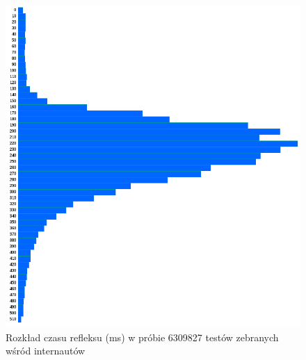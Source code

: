 {\begin{figure}[htb]
\begin{center}
	\includegraphics[width=35em,keepaspectratio]{img/reaction_times}
	\caption{Rozkład czasu refleksu (ms) w próbie 6309827 testów zebranych wśród internautów \cite{ReactionTime}}
	\label{reaction}
    \end{center}
\end{figure}

}
